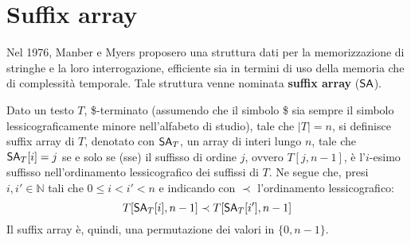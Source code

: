 \section{Suffix array}
Nel 1976, Manber e Myers \cite{sa} proposero una struttura dati per la
memorizzazione di 
stringhe e la loro interrogazione, efficiente sia in termini di uso della
memoria che di complessità temporale. Tale struttura venne nominata
\textbf{suffix array} ($\mbox{\rm {\sf SA}}$).
\begin{definizione}
  Dato un testo $T$, \$-terminato (assumendo che il simbolo \$ sia sempre il
  simbolo lessicograficamente minore nell'alfabeto di studio), tale che $|T|=n$,
  si definisce suffix 
    array di $T$, denotato con $\mbox{\rm {\sf SA}}_T$, un array di interi lungo $n$, tale che
  $\mbox{\rm {\sf SA}}_T[i]=j$ se e solo se (sse) il suffisso di ordine $j$, ovvero $T[j,n-1]$,
  è 
  l'$i$-esimo suffisso nell’ordinamento lessicografico dei suffissi di $T$. Ne
  segue che, presi $i,i'\in \mathbb{N}$
  tali che $0\leq i < i' < n$ e indicando con $\prec$
  l'ordinamento lessicografico:
  \begin{equation}
    \label{eq:saord}
    T[\mbox{\rm {\sf SA}}_T[i],n-1] \prec T[\mbox{\rm {\sf SA}}_T[i'],n-1]
  \end{equation}
  Il suffix array è, quindi, una permutazione dei valori in
  $\{0,n-1\}$. 
\end{definizione}
